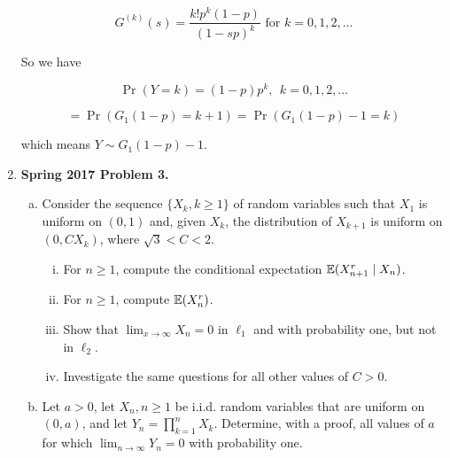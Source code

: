 \begin{enumerate}[(1)]
\[
G^{(k)}(s) = \frac{k!p^k (1-p)}{(1-sp)^k} \text{ for } k = 0, 1, 2, \ldots
\]

So we have

\[
\Pr(Y=k) = (1-p)p^k, \ \ k= 0, 1, 2, \ldots
\]

\[
= \Pr(G_1(1-p) = k +1) = \Pr(G_1(1-p) - 1 = k)
\]

which means \(Y \sim G_1(1-p) - 1\).


\item \textbf{Spring 2017 Problem 3.}



\begin{enumerate}[(a)]

\item Consider the sequence \(\{X_k, k \geq 1\}\) of random variables such that \(X_1\) is uniform on \((0, 1)\) and, given \(X_k\), the distribution of \(X_{k+1}\) is uniform on \((0, CX_k)\), where \(\sqrt{3} < C < 2\).

\begin{enumerate}[(i)]

\item For \(n \geq 1\), compute the conditional expectation \(\mathbb{E}(X_{n+1}^r \mid X_n)\).

\item For \(n \geq 1\), compute \(\mathbb{E}(X_n^r)\).

\item Show that \(\lim_{x \to \infty} X_n = 0\) in \(\ell_1\) and with probability one, but not in \(\ell_2\). 

\item Investigate the same questions for all other values of \(C > 0\).

\end{enumerate}

\item Let \(a > 0\), let \(X_n, n \geq 1\) be i.i.d. random variables that are uniform on \((0, a)\), and let \(Y_n = \prod_{k=1}^n X_k\). Determine, with a proof, all values of \(a\) for which \(\lim_{n \to \infty} Y_n = 0\) with probability one.

\end{enumerate}


\end{enumerate}
